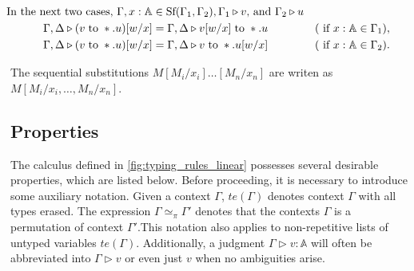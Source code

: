 \begin{definition}
\begin{align*}
  \hspace{-23pt}\text{In the next two cases, }\Gamma,x: \mathbb{A} &  \in \text{Sf}(\Gamma_1,\Gamma_2), \Gamma_1 \triangleright v \text{, and } \Gamma_2 \triangleright u  \\
  \hspace{-23pt}\Gamma, \Delta  \triangleright(v \hspace{3 pt} \text{to} \hspace{3 pt} *.u)[w/x] &= \Gamma, \Delta  \triangleright v[w/x] \hspace{3 pt} \text{to} \hspace{3 pt} *.u&  (\text{ if } x: \mathbb{A} \in \Gamma_1),\\
  \hspace{-23pt}\Gamma, \Delta  \triangleright(v \hspace{3 pt} \text{to} \hspace{3 pt} *.u)[w/x] &= \Gamma, \Delta  \triangleright v \hspace{3 pt} \text{to} \hspace{3 pt} *.u[w/x] &  (\text{ if } x: \mathbb{A} \in \Gamma_2).\\
\end{align*}
\end{definition}

The sequential substitutions $M[M_i/x_i] \ldots [M_n/x_n]$ are writen as $M[M_i/x_i, \ldots ,M_n/x_n]$.


\subsection{Properties}


The calculus defined in \autoref{fig:typing_rules_linear} possesses several desirable properties, which are listed below. Before proceeding, it is necessary to introduce some auxiliary notation. Given a context $\Gamma$, $te(\Gamma)$ denotes context $\Gamma$ with all types erased. The expression $\Gamma \simeq_{\pi} \Gamma'$ denotes that the contexts $\Gamma$ is a permutation of context $\Gamma'$.This notation also applies to non-repetitive lists of untyped variables $te(\Gamma)$. Additionally, a judgment $\Gamma \triangleright v: \mathbb{A}$ will often be abbreviated into $\Gamma \triangleright v $ or even just $v$ when no ambiguities arise.

